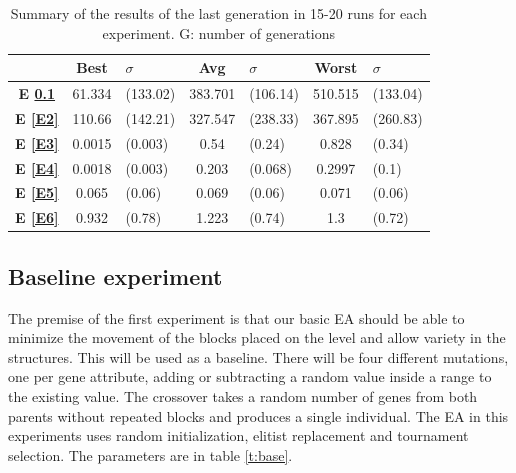 \documentclass[sigconf]{acmart}
\newcommand{\myfloatalign}{\centering} %
\begin{document}
\begin{table}
	\myfloatalign
	\begin{tabular}{cclclcl}
		& \textbf{Best}& $\sigma$  &\textbf{Avg}&$\sigma$  & 
		\textbf{Worst}&$\sigma$ \\ \hline
		\textbf{E \ref{E1}}&61.334&(133.02)&383.701&(106.14)&510.515&(133.04)\\  \hline
		\textbf{E \ref{E2}}&110.66&(142.21)&327.547&(238.33)&367.895&(260.83)  \\  
		\hline
		\textbf{E \ref{E3}}&0.0015&(0.003)&0.54&(0.24)&0.828&(0.34)   \\  \hline
		\textbf{E \ref{E4}}&0.0018&(0.003)&0.203&(0.068)&0.2997&(0.1)  \\  \hline
		\textbf{E \ref{E5}}& 0.065&(0.06)&0.069&(0.06)&0.071&(0.06)     \\  \hline 
		\textbf{E \ref{E6}}& 0.932&(0.78)&1.223&(0.74)&1.3&(0.72) \\  \hline
		\hline
	\end{tabular}
	\caption{Summary of the results of the last generation in 15-20 runs for 
	each
		experiment.
		G: number of generations} %
	\label{t:resOver2}
\end{table}

\subsection{Baseline experiment}\label{E1}

The premise of the first experiment is that our basic EA should be able to 
minimize the movement of the blocks placed on the level and
allow variety in the structures. This will
be used as a baseline.
There will be four different mutations, one per gene attribute, adding or subtracting a random value inside a range to the existing value.
The crossover takes a random number of genes from both parents
without repeated blocks and produces a single individual.
The EA in this experiments uses random initialization, elitist replacement and tournament selection. The parameters are in table \ref{t:base}.
\end{document}
